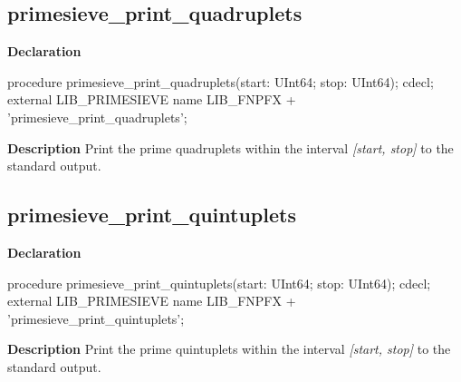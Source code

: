 \documentclass{report}
\newif\ifpdf
\begin{document}
\subsection*{primesieve{\_}print{\_}quadruplets}
\fi
\label{primesieve-primesieve_print_quadruplets}
\begin{list}{}{
\setlength{\itemindent}{0cm}
\setlength{\listparindent}{0cm}
\setlength{\leftmargin}{\evensidemargin}
\addtolength{\leftmargin}{\tmplength}
\settowidth{\labelsep}{X}
\addtolength{\leftmargin}{\labelsep}
\setlength{\labelwidth}{\tmplength}
}
\item[\textbf{Declaration}\hfill]
\ifpdf
\begin{flushleft}
\fi
\begin{ttfamily}
procedure primesieve{\_}print{\_}quadruplets(start: UInt64; stop: UInt64); cdecl; external LIB{\_}PRIMESIEVE name LIB{\_}FNPFX + 'primesieve{\_}print{\_}quadruplets';\end{ttfamily}

\ifpdf
\end{flushleft}
\fi

\par
\item[\textbf{Description}]
Print the prime quadruplets within the interval \textit{[start, stop]} to the standard output.

\end{list}
\ifpdf
\subsection*{\large{\textbf{primesieve{\_}print{\_}quintuplets}}\normalsize\hspace{1ex}\hrulefill}
\else
\subsection*{primesieve{\_}print{\_}quintuplets}
\fi
\label{primesieve-primesieve_print_quintuplets}
\begin{list}{}{
\setlength{\itemindent}{0cm}
\setlength{\listparindent}{0cm}
\setlength{\leftmargin}{\evensidemargin}
\addtolength{\leftmargin}{\tmplength}
\settowidth{\labelsep}{X}
\addtolength{\leftmargin}{\labelsep}
\setlength{\labelwidth}{\tmplength}
}
\item[\textbf{Declaration}\hfill]
\ifpdf
\begin{flushleft}
\fi
\begin{ttfamily}
procedure primesieve{\_}print{\_}quintuplets(start: UInt64; stop: UInt64); cdecl; external LIB{\_}PRIMESIEVE name LIB{\_}FNPFX + 'primesieve{\_}print{\_}quintuplets';\end{ttfamily}

\ifpdf
\end{flushleft}
\fi

\par
\item[\textbf{Description}]
Print the prime quintuplets within the interval \textit{[start, stop]} to the standard output.

\end{list}
\ifpdf
\end{document}
